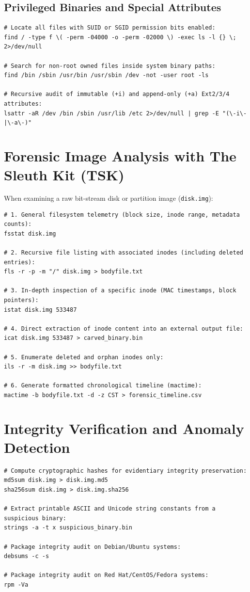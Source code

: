 \subsection{Privileged Binaries and Special Attributes}
\begin{lstlisting}[style=terminal]
# Locate all files with SUID or SGID permission bits enabled:
find / -type f \( -perm -04000 -o -perm -02000 \) -exec ls -l {} \; 2>/dev/null

# Search for non-root owned files inside system binary paths:
find /bin /sbin /usr/bin /usr/sbin /dev -not -user root -ls

# Recursive audit of immutable (+i) and append-only (+a) Ext2/3/4 attributes:
lsattr -aR /dev /bin /sbin /usr/lib /etc 2>/dev/null | grep -E "(\-i\-|\-a\-)"
\end{lstlisting}

\section{Forensic Image Analysis with The Sleuth Kit (TSK)}

When examining a raw bit-stream disk or partition image (\texttt{disk.img}):

\begin{lstlisting}[style=terminal]
# 1. General filesystem telemetry (block size, inode range, metadata counts):
fsstat disk.img

# 2. Recursive file listing with associated inodes (including deleted entries):
fls -r -p -m "/" disk.img > bodyfile.txt

# 3. In-depth inspection of a specific inode (MAC timestamps, block pointers):
istat disk.img 533487

# 4. Direct extraction of inode content into an external output file:
icat disk.img 533487 > carved_binary.bin

# 5. Enumerate deleted and orphan inodes only:
ils -r -m disk.img >> bodyfile.txt

# 6. Generate formatted chronological timeline (mactime):
mactime -b bodyfile.txt -d -z CST > forensic_timeline.csv
\end{lstlisting}

\section{Integrity Verification and Anomaly Detection}

\begin{lstlisting}[style=terminal]
# Compute cryptographic hashes for evidentiary integrity preservation:
md5sum disk.img > disk.img.md5
sha256sum disk.img > disk.img.sha256

# Extract printable ASCII and Unicode string constants from a suspicious binary:
strings -a -t x suspicious_binary.bin

# Package integrity audit on Debian/Ubuntu systems:
debsums -c -s

# Package integrity audit on Red Hat/CentOS/Fedora systems:
rpm -Va
\end{lstlisting}
